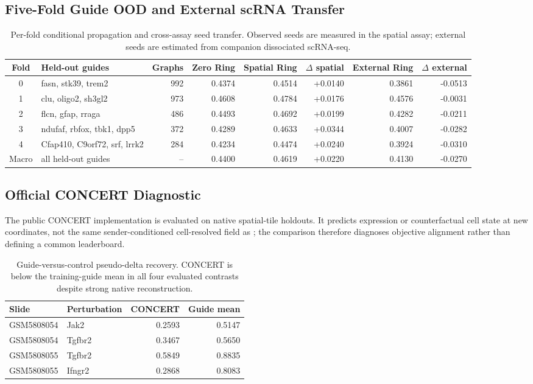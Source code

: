 \subsection{Five-Fold Guide OOD and External scRNA Transfer}
\label{app:fivefold_seed_transfer}
\begin{table}[h]
\centering\scriptsize
\caption{Per-fold conditional propagation and cross-assay seed transfer. Observed seeds are measured in the spatial assay; external seeds are estimated from companion dissociated scRNA-seq.}
\label{tab:app_fivefold_seed_transfer}
\begin{tabular}{clrrrrrr}
\toprule
Fold & Held-out guides & Graphs & Zero Ring & Spatial Ring & $\Delta$ spatial & External Ring & $\Delta$ external \\
\midrule
0 & fasn, stk39, trem2 & 992 & 0.4374 & 0.4514 & +0.0140 & 0.3861 & -0.0513 \\
1 & clu, oligo2, sh3gl2 & 973 & 0.4608 & 0.4784 & +0.0176 & 0.4576 & -0.0031 \\
2 & flcn, gfap, rraga & 486 & 0.4493 & 0.4692 & +0.0199 & 0.4282 & -0.0211 \\
3 & ndufaf, rbfox, tbk1, dpp5 & 372 & 0.4289 & 0.4633 & +0.0344 & 0.4007 & -0.0282 \\
4 & Cfap410, C9orf72, srf, lrrk2 & 284 & 0.4234 & 0.4474 & +0.0240 & 0.3924 & -0.0310 \\
\midrule
Macro & all held-out guides & -- & 0.4400 & 0.4619 & +0.0220 & 0.4130 & -0.0270 \\
\bottomrule
\end{tabular}
\end{table}

\subsection{Official CONCERT Diagnostic}
\label{app:concert_diagnostic}
The public CONCERT implementation is evaluated on native spatial-tile holdouts. It predicts expression or counterfactual cell state at new coordinates, not the same sender-conditioned cell-resolved field as \methodname{}; the comparison therefore diagnoses objective alignment rather than defining a common leaderboard.
\begin{table}[h]
\centering\scriptsize
\caption{Guide-versus-control pseudo-delta recovery. CONCERT is below the training-guide mean in all four evaluated contrasts despite strong native reconstruction.}
\label{tab:app_concert_diagnostic}
\begin{tabular}{llrr}
\toprule
Slide & Perturbation & CONCERT & Guide mean \\
\midrule
GSM5808054 & Jak2 & 0.2593 & 0.5147 \\
GSM5808054 & Tgfbr2 & 0.3467 & 0.5650 \\
GSM5808055 & Tgfbr2 & 0.5849 & 0.8835 \\
GSM5808055 & Ifngr2 & 0.2868 & 0.8083 \\
\bottomrule
\end{tabular}
\end{table}

